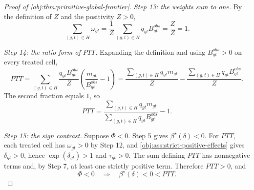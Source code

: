 \documentclass[11pt]{article}
\begin{document}
\begin{proof}[Proof of \cref{obj:thm:primitive-global-frontier}]
\textit{Step 13: the weights sum to one.} By the definition of \(Z\) and the positivity \(Z>0\),
\[
\sum_{(g,t)\in H}\omega_{gt}
=
\frac{1}{Z}\sum_{(g,t)\in H}q_{gt}B^{obs}_{gt}
=
\frac{Z}{Z}
=
1 .
\]

\textit{Step 14: the ratio form of \(PTT\).} Expanding the definition and using \(B^{obs}_{gt}>0\) on every treated cell,
\[
PTT
=
\sum_{(g,t)\in H}\frac{q_{gt}B^{obs}_{gt}}{Z}\left(\frac{m_{gt}}{B^{obs}_{gt}}-1\right)
=
\frac{\sum_{(g,t)\in H}q_{gt}m_{gt}}{Z}
-
\frac{\sum_{(g,t)\in H}q_{gt}B^{obs}_{gt}}{Z}.
\]
The second fraction equals \(1\), so
\[
PTT=\frac{\sum_{(g,t)\in H}q_{gt}m_{gt}}{\sum_{(g,t)\in H}q_{gt}B^{obs}_{gt}}-1 .
\]

\textit{Step 15: the sign contrast.} Suppose \(\Phi<0\). Step 5 gives \(\beta^\star(\delta)<0\). For \(PTT\), each treated cell has \(\omega_{gt}>0\) by Step 12, and \cref{obj:ass:strict-positive-effects} gives \(\delta_{gt}>0\), hence \(\exp(\delta_{gt})>1\) and \(\tau_{gt}>0\). The sum defining \(PTT\) has nonnegative terms and, by Step 7, at least one strictly positive term. Therefore \(PTT>0\), and
\[
\Phi<0\quad\Longrightarrow\quad \beta^\star(\delta)<0<PTT .
\]
\end{proof}




\end{document}
